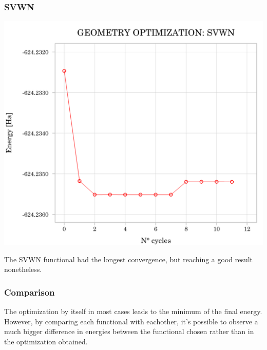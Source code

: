 \documentclass{article}
\begin{document}
\subsubsection{SVWN}
\noindent\begin{minipage}[t]{0.55\textwidth}
	\vspace{-\topskip}
	\includegraphics[width=1\textwidth]{../images/SVWN.png}
	\label{fig:opt_SVWN}
\end{minipage}
\hfill
\begin{minipage}[t]{0.4\textwidth}
	\vspace{-\topskip}
	\vspace{20pt}
	The SVWN functional had the longest convergence, but reaching a good result nonetheless.
\end{minipage}

\subsubsection{Comparison}

The optimization by itself in most cases leads to the minimum of the final energy. 
However, by comparing each functional with eachother, it's possible to observe a much bigger difference in energies between the functional chosen rather than in the optimization obtained. 

\end{document}
